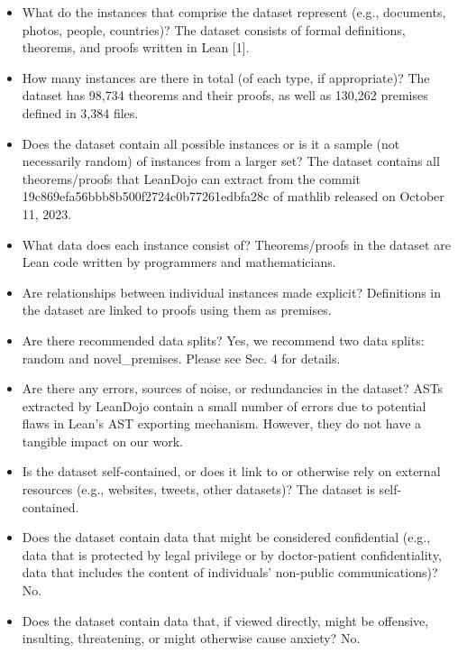 \documentclass[
]{article}
\providecommand{\tightlist}{%
  \setlength{\itemsep}{0pt}\setlength{\parskip}{0pt}}
\begin{document}
\begin{itemize}
\tightlist
\item
  What do the instances that comprise the dataset represent (e.g.,
  documents, photos, people, countries)? The dataset consists of formal
  definitions, theorems, and proofs written in Lean {[}1{]}.\\
\item
  How many instances are there in total (of each type, if appropriate)?
  The dataset has 98,734 theorems and their proofs, as well as 130,262
  premises defined in 3,384 files.\\
\item
  Does the dataset contain all possible instances or is it a sample (not
  necessarily random) of instances from a larger set? The dataset
  contains all theorems/proofs that LeanDojo can extract from the commit
  19c869efa56bbb8b500f2724c0b77261edbfa28c of mathlib released on
  October 11, 2023.\\
\item
  What data does each instance consist of? Theorems/proofs in the
  dataset are Lean code written by programmers and mathematicians.\\
\item
  Are relationships between individual instances made explicit?
  Definitions in the dataset are linked to proofs using them as
  premises.\\
\item
  Are there recommended data splits? Yes, we recommend two data splits:
  random and novel\_premises. Please see Sec. 4 for details.\\
\item
  Are there any errors, sources of noise, or redundancies in the
  dataset? ASTs extracted by LeanDojo contain a small number of errors
  due to potential flaws in Lean's AST exporting mechanism. However,
  they do not have a tangible impact on our work.\\
\item
  Is the dataset self-contained, or does it link to or otherwise rely on
  external resources (e.g., websites, tweets, other datasets)? The
  dataset is self-contained.\\
\item
  Does the dataset contain data that might be considered confidential
  (e.g., data that is protected by legal privilege or by doctor-patient
  confidentiality, data that includes the content of individuals'
  non-public communications)? No.\\
\item
  Does the dataset contain data that, if viewed directly, might be
  offensive, insulting, threatening, or might otherwise cause anxiety?
  No.
\end{itemize}
\end{document}
